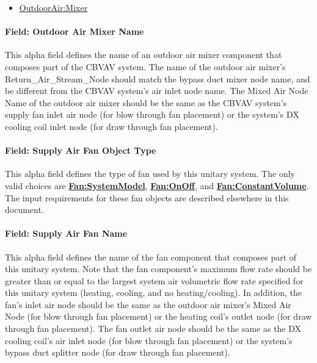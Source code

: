 \begin{itemize}
\tightlist
\item
  \hyperref[outdoorairmixer]{OutdoorAir:Mixer}
\end{itemize}

\paragraph{Field: Outdoor Air Mixer Name}\label{field-outdoor-air-mixer-name}

This alpha field defines the name of an outdoor air mixer component that composes part of the CBVAV system. The name of the outdoor air mixer's Return\_Air\_Stream\_Node should match the bypass duct mixer node name, and be different from the CBVAV system's air inlet node name. The Mixed Air Node Name of the outdoor air mixer should be the same as the CBVAV system's supply fan inlet air node (for blow through fan placement) or the system's DX cooling coil inlet node (for draw through fan placement).

\paragraph{Field: Supply Air Fan Object Type}\label{field-supply-air-fan-object-type-3}

This alpha field defines the type of fan used by this unitary system. The only valid choices are \textbf{\hyperref[fansystemmodel]{Fan:SystemModel}}, \textbf{\hyperref[fanonoff]{Fan:OnOff}}, and \textbf{\hyperref[fanconstantvolume]{Fan:ConstantVolume}}. The input requirements for these fan objects are described elsewhere in this document.

\paragraph{Field: Supply Air Fan Name}\label{field-supply-air-fan-name-3}

This alpha field defines the name of the fan component that composes part of this unitary system. Note that the fan component's maximum flow rate should be greater than or equal to the largest system air volumetric flow rate specified for this unitary system (heating, cooling, and no heating/cooling). In addition, the fan's inlet air node should be the same as the outdoor air mixer's Mixed Air Node (for blow through fan placement) or the heating coil's outlet node (for draw through fan placement). The fan outlet air node should be the same as the DX cooling coil's air inlet node (for blow through fan placement) or the system's bypass duct splitter node (for draw through fan placement).

